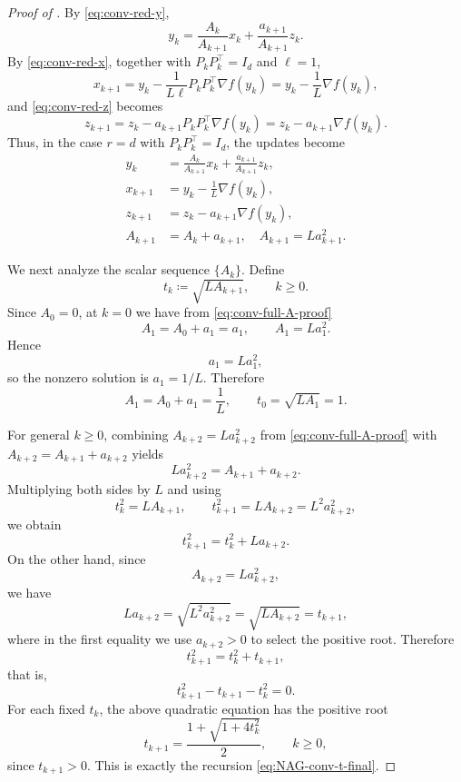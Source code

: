 \documentclass[10pt]{article}
\begin{document}
\begin{proof}[Proof of ]
By \eqref{eq:conv-red-y},
\[
y_k = \frac{A_k}{A_{k+1}}x_k + \frac{a_{k+1}}{A_{k+1}}z_k.
\]
By \eqref{eq:conv-red-x}, together with \(P_kP_k^\top = I_d\) and \(\ell=1\),
\[
x_{k+1}
=
y_k - \frac{1}{L\ell}P_kP_k^\top\nabla f(y_k)
=
y_k - \frac{1}{L}\nabla f(y_k),
\]
and \eqref{eq:conv-red-z} becomes
\[
z_{k+1}
=
z_k - a_{k+1}P_kP_k^\top \nabla f(y_k)
=
z_k - a_{k+1}\nabla f(y_k).
\]
Thus, in the case \(r=d\) with \(P_kP_k^\top=I_d\),  the updates become
\begin{align}
y_k &= \frac{A_k}{A_{k+1}}x_k + \frac{a_{k+1}}{A_{k+1}}z_k,
\label{eq:conv-full-y-proof}\\
x_{k+1} &= y_k - \frac{1}{L}\nabla f(y_k),
\label{eq:conv-full-x-proof}\\
z_{k+1} &= z_k - a_{k+1}\nabla f(y_k),
\label{eq:conv-full-z-proof}\\
A_{k+1} &= A_k + a_{k+1},\quad A_{k+1}=La_{k+1}^2.
\label{eq:conv-full-A-proof}
\end{align}

We next analyze the scalar sequence \(\{A_k\}\).
Define
\[
t_k\coloneqq\sqrt{L A_{k+1}},\qquad k\ge 0.
\]
Since \(A_0=0\), at \(k=0\) we have from \eqref{eq:conv-full-A-proof}
\[
A_1=A_0+a_1=a_1,
\qquad
A_1=La_1^2.
\]
Hence
\[
a_1=La_1^2,
\]
so the nonzero solution is \(a_1=1/L\). Therefore
\[
A_1=A_0+a_1=\frac{1}{L},
\qquad
t_0=\sqrt{L A_1}=1.
\]

For general \(k\ge 0\), combining \(A_{k+2}=La_{k+2}^2\) from
\eqref{eq:conv-full-A-proof} with \(A_{k+2}=A_{k+1}+a_{k+2}\) yields
\[
La_{k+2}^2 = A_{k+1}+a_{k+2}.
\]
Multiplying both sides by \(L\) and using
\[
t_k^2=L A_{k+1},
\qquad
t_{k+1}^2=L A_{k+2}=L^2 a_{k+2}^2,
\]
we obtain
\[
t_{k+1}^2 = t_k^2 + L a_{k+2}.
\]
On the other hand, since
\[
A_{k+2}=La_{k+2}^2,
\]
we have
\[
L a_{k+2}
=
\sqrt{L^2 a_{k+2}^2}
=
\sqrt{L A_{k+2}}
=
t_{k+1},
\]
where in the first equality we use \(a_{k+2}>0\) to select the positive root.
Therefore
\[
t_{k+1}^2 = t_k^2 + t_{k+1},
\]
that is,
\[
t_{k+1}^2 - t_{k+1} - t_k^2 = 0.
\]
For each fixed \(t_k\), the above quadratic equation has the positive root
\begin{equation}
t_{k+1}
=
\frac{1+\sqrt{1+4t_k^2}}{2},
\qquad k\ge 0,
\label{eq:t-recursion}
\end{equation}
since \(t_{k+1}>0\).
This is exactly the recursion \eqref{eq:NAG-conv-t-final}.



\end{proof}
\end{document}
